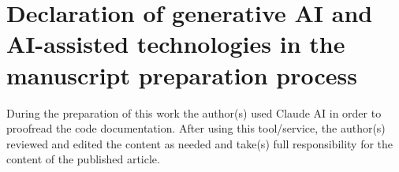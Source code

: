 \documentclass[preprint,12pt, a4paper]{elsarticle}
\begin{document}
\section*{Declaration of generative AI and AI-assisted technologies in the manuscript preparation process}

During the preparation of this work the author(s) used Claude AI in order to proofread the code documentation. After using this tool/service, the author(s) reviewed and edited the content as needed and take(s) full responsibility for the content of the published article.




\nocite{Ayala_etal2026}

 




\end{document}
